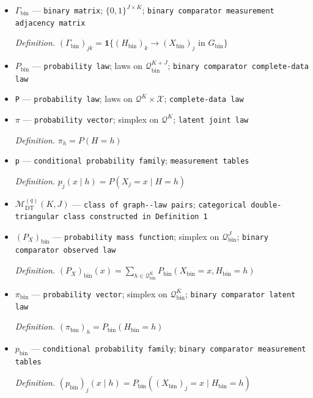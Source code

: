 \documentclass{article}
\begin{document}
\begin{itemize}
  \par\smallskip\noindent\emph{Definition.} the edges of \(G_{\mathrm{bin}}\) whose endpoints are both latent
  \item \(\Gamma_{\mathrm{bin}}\) --- \texttt{binary matrix}; \(\{0,1\}^{J\times K}\); \texttt{binary comparator measurement adjacency matrix}
  \par\smallskip\noindent\emph{Definition.} \((\Gamma_{\mathrm{bin}})_{jk}=\mathbf 1\{(H_{\mathrm{bin}})_k\to(X_{\mathrm{bin}})_j\text{ in }G_{\mathrm{bin}}\}\)
  \item \(P_{\mathrm{bin}}\) --- \texttt{probability law}; laws on \(\mathcal Q_{\mathrm{bin}}^{K+J}\); \texttt{binary comparator complete-\allowbreak{}data law}
  \item \texttt{P} --- \texttt{probability law}; laws on \(\mathcal Q^K\times\mathcal X\); \texttt{complete-\allowbreak{}data law}
  \item \(\pi\) --- \texttt{probability vector}; simplex on \(\mathcal Q^K\); \texttt{latent joint law}
  \par\smallskip\noindent\emph{Definition.} \(\pi_h=P(H=h)\)
  \item \texttt{p} --- \texttt{conditional probability family}; \texttt{measurement tables}
  \par\smallskip\noindent\emph{Definition.} \(p_j(x\mid h)=P(X_j=x\mid H=h)\)
  \item \(\mathcal M_{\mathrm{DT}}^{(q)}(K,J)\) --- \texttt{class of graph-\allowbreak{}-\allowbreak{}law pairs}; \texttt{categorical double-\allowbreak{}triangular class constructed in Definition 1}
  \item \((P_X)_{\mathrm{bin}}\) --- \texttt{probability mass function}; simplex on \(\mathcal Q_{\mathrm{bin}}^J\); \texttt{binary comparator observed law}
  \par\smallskip\noindent\emph{Definition.} \((P_X)_{\mathrm{bin}}(x)=\sum_{h\in\mathcal Q_{\mathrm{bin}}^K}P_{\mathrm{bin}}(X_{\mathrm{bin}}=x,H_{\mathrm{bin}}=h)\)
  \item \(\pi_{\mathrm{bin}}\) --- \texttt{probability vector}; simplex on \(\mathcal Q_{\mathrm{bin}}^K\); \texttt{binary comparator latent law}
  \par\smallskip\noindent\emph{Definition.} \((\pi_{\mathrm{bin}})_h=P_{\mathrm{bin}}(H_{\mathrm{bin}}=h)\)
  \item \(p_{\mathrm{bin}}\) --- \texttt{conditional probability family}; \texttt{binary comparator measurement tables}
  \par\smallskip\noindent\emph{Definition.} \((p_{\mathrm{bin}})_j(x\mid h)=P_{\mathrm{bin}}((X_{\mathrm{bin}})_j=x\mid H_{\mathrm{bin}}=h)\)

\end{itemize}
\end{document}
